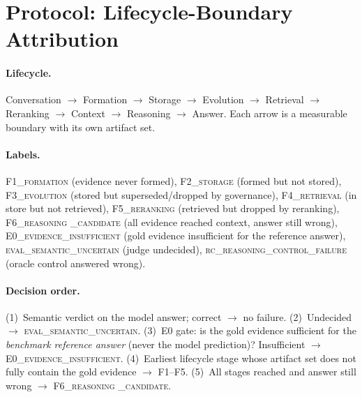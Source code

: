 \documentclass[11pt]{article}
\newcommand{\fone}{F1\textsc{\_formation}}
\newcommand{\ftwo}{F2\textsc{\_storage}}
\newcommand{\fthree}{F3\textsc{\_evolution}}
\newcommand{\ffour}{F4\textsc{\_retrieval}}
\newcommand{\ffive}{F5\textsc{\_reranking}}
\newcommand{\fsix}{F6\textsc{\_reasoning}}
\newcommand{\ezero}{E0\textsc{\_evidence\_insufficient}}
\newcommand{\evaluncertain}{\textsc{eval\_semantic\_uncertain}}
\newcommand{\rcfailure}{\textsc{rc\_reasoning\_control\_failure}}
\begin{document}
\section{Protocol: Lifecycle-Boundary Attribution}
\label{sec:protocol}

\paragraph{Lifecycle.}
Conversation $\rightarrow$ Formation $\rightarrow$ Storage $\rightarrow$
Evolution $\rightarrow$ Retrieval $\rightarrow$ Reranking $\rightarrow$
Context $\rightarrow$ Reasoning $\rightarrow$ Answer. Each arrow is a
measurable boundary with its own artifact set.

\paragraph{Labels.}
\fone{} (evidence never formed), \ftwo{} (formed but not stored),
\fthree{} (stored but superseded/dropped by governance), \ffour{} (in store
but not retrieved), \ffive{} (retrieved but dropped by reranking),
\fsix{} \textsc{\_candidate} (all evidence reached context, answer still
wrong), \ezero{} (gold evidence insufficient for the reference answer),
\evaluncertain{} (judge undecided), \rcfailure{} (oracle control answered
wrong).

\paragraph{Decision order.}
(1)~Semantic verdict on the model answer; correct $\rightarrow$ no failure.
(2)~Undecided $\rightarrow$ \evaluncertain{}. (3)~E0 gate: is the gold
evidence sufficient for the \emph{benchmark reference answer} (never the
model prediction)? Insufficient $\rightarrow$ \ezero{}. (4)~Earliest
lifecycle stage whose artifact set does not fully contain the gold evidence
$\rightarrow$ F1--F5. (5)~All stages reached and answer still wrong
$\rightarrow$ \fsix{} \textsc{\_candidate}.
\end{document}
